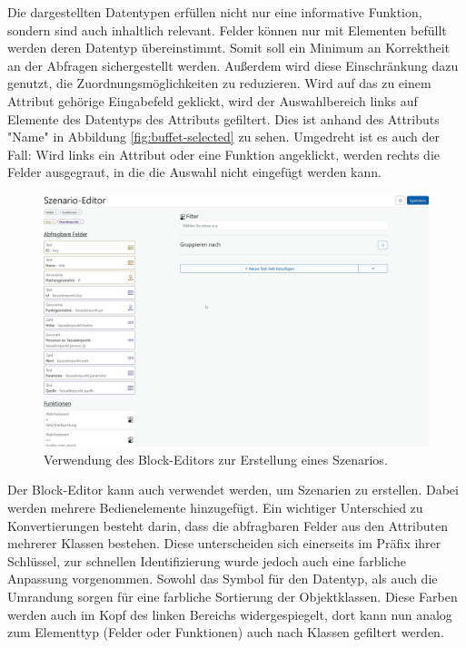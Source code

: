Die dargestellten Datentypen erfüllen nicht nur eine informative Funktion, sondern sind auch inhaltlich relevant. Felder können nur mit Elementen befüllt werden deren Datentyp übereinstimmt. Somit soll ein Minimum an Korrektheit an der Abfragen sichergestellt werden. Außerdem wird diese Einschränkung dazu genutzt, die Zuordnungsmöglichkeiten zu reduzieren. Wird auf das zu einem Attribut gehörige Eingabefeld geklickt, wird der Auswahlbereich links auf Elemente des Datentyps des Attributs gefiltert. Dies ist anhand des Attributs "Name" in Abbildung \ref{fig:buffet-selected} zu sehen. Umgedreht ist es auch der Fall: Wird links ein Attribut oder eine Funktion angeklickt, werden rechts die Felder ausgegraut, in die die Auswahl nicht eingefügt werden kann. 

\begin{figure}[ht]
  \begin{center}
    \includegraphics[width=.95\textwidth]{assets/buffet-scenario.png}
  \end{center}
  \caption{Verwendung des Block-Editors zur Erstellung eines Szenarios. }
  \label{fig:buffet-scenario}
\end{figure}

Der Block-Editor kann auch verwendet werden, um Szenarien zu erstellen. Dabei werden mehrere Bedienelemente hinzugefügt. Ein wichtiger Unterschied zu Konvertierungen besteht darin, dass die abfragbaren Felder aus den Attributen mehrerer Klassen bestehen. Diese unterscheiden sich einerseits im Präfix ihrer Schlüssel, zur schnellen Identifizierung wurde jedoch auch eine farbliche Anpassung vorgenommen. Sowohl das Symbol für den Datentyp, als auch die Umrandung sorgen für eine farbliche Sortierung der Objektklassen. Diese Farben werden auch im Kopf des linken Bereichs widergespiegelt, dort kann nun analog zum Elementtyp (Felder oder Funktionen) auch nach Klassen gefiltert werden. 

